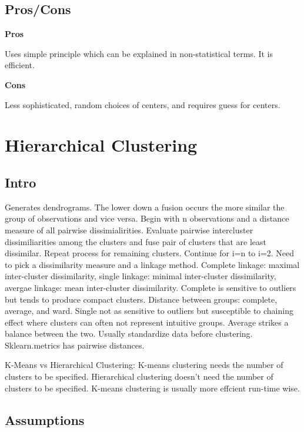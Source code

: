 \documentclass[]{book}
\theoremstyle{definition}
\theoremstyle{definition}
\theoremstyle{definition}
\theoremstyle{remark}
\begin{document}
\subsection{Pros/Cons}\label{proscons-5}

\textbf{Pros}

Uses simple principle which can be explained in non-statistical terms.
It is efficient.

\textbf{Cons}

Less sophisticated, random choices of centers, and requires guess for
centers.

\section{Hierarchical Clustering}\label{hierarchical-clustering}

\subsection{Intro}\label{intro-6}

Generates dendrograms. The lower down a fusion occurs the more similar
the group of observations and vice versa. Begin with n observations and
a distance measure of all pairwise dissimialirities. Evaluate pairwise
intercluster dissimiliarities among the clusters and fuse pair of
clusters that are least dissimilar. Repeat process for remaining
clusters. Continue for i=n to i=2. Need to pick a dissimilarity measure
and a linkage method. Complete linkage: maximal inter-cluster
dissimilarity, single linkage: minimal inter-cluster dissimilarity,
avergae linkage: mean inter-cluster dissimilarity. Complete is sensitive
to outliers but tends to produce compact clusters. Distance between
groups: complete, average, and ward. Single not as sensitive to outliers
but susceptible to chaining effect where clusters can often not
represent intuitive groups. Average strikes a balance between the two.
Usually standardize data before clustering. Sklearn.metrics has pairwise
distances.

K-Means vs Hierarchical Clustering: K-means clustering needs the number
of clusters to be speciﬁed. Hierarchical clustering doesn't need the
number of clusters to be speciﬁed. K-means clustering is usually more
effcient run-time wise.

\subsection{Assumptions}\label{assumptions-6}
\end{document}
